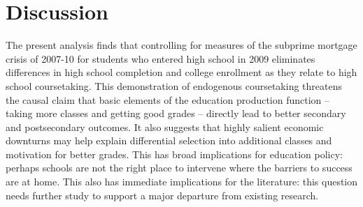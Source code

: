 \documentclass[letterpaper, 12pt]{article}
\begin{document}
\section{Discussion}

The present analysis finds that controlling for measures of the subprime mortgage crisis of 2007-10 for students who entered high school in 2009 eliminates differences in high school completion and college enrollment as they relate to high school coursetaking. This demonstration of endogenous coursetaking threatens the causal claim that basic elements of the education production function -- taking more classes and getting good grades -- directly lead to better secondary and postsecondary outcomes. It also suggests that highly salient economic downturns may help explain differential selection into additional classes and motivation for better grades. This has broad implications for education policy: perhaps schools are not the right place to intervene where the barriers to success are at home. This also has immediate implications for the literature: this question needs further study to support a major departure from existing research.
\end{document}
